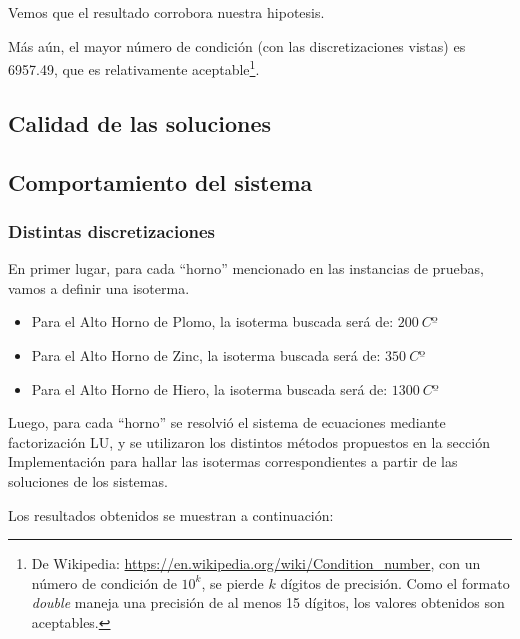 Vemos que el resultado corrobora nuestra hipotesis.

Más aún, el mayor número de condición (con las discretizaciones vistas) es 6957.49, que es relativamente aceptable\footnote{De Wikipedia: \url{https://en.wikipedia.org/wiki/Condition_number}, con un número de condición de $10^k$, se pierde $k$ dígitos de precisión. Como el formato \textit{double} maneja una precisión de al menos 15 dígitos, los valores obtenidos son aceptables.}.

\subsection{Calidad de las soluciones}

\subsection{Comportamiento del sistema}

\subsubsection{Distintas discretizaciones}

En primer lugar, para cada ``horno'' mencionado en las instancias de pruebas, vamos a definir una isoterma.
\begin{itemize}
    \item Para el Alto Horno de Plomo, la isoterma buscada será de: $200\ Cº$
    \item Para el Alto Horno de Zinc, la isoterma buscada será de: $350\ Cº$
    \item Para el Alto Horno de Hiero, la isoterma buscada será de: $1300\ Cº$
\end{itemize}

Luego, para cada ``horno'' se resolvió el sistema de ecuaciones mediante factorización LU, y se utilizaron los distintos métodos propuestos en la sección Implementación para hallar las isotermas correspondientes a partir de las soluciones de los sistemas.

Los resultados obtenidos se muestran a continuación:

